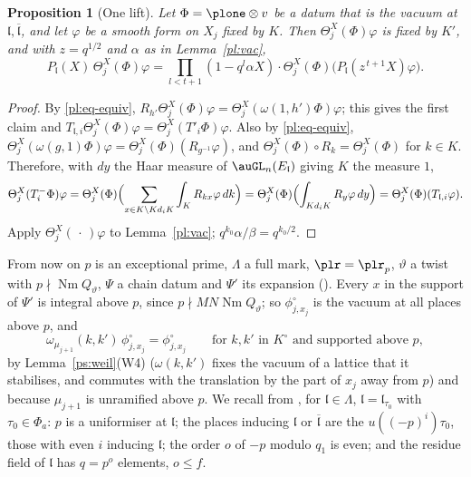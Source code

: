 \documentclass[10pt]{amsart}
\newtheorem{proposition}[theorem]{Proposition}
\theoremstyle{definition}
\theoremstyle{remark}
\providecommand{\auNm}{\operatorname{Nm}}
\providecommand{\auPa}{\Phi_a}
\providecommand{\aubar}[1]{\overline{#1}}
\begin{document}
\begin{proposition}[One lift]\label{pl:onelift}
Let $\Phi=\plone\otimes v$ be a datum that is the vacuum at $\mathfrak l,\aubar{\mathfrak l}$, and
let $\varphi$ be a smooth form on $X_j$ fixed by $K$. Then $\Theta^X_j(\Phi)\varphi$ is fixed by
$K'$, and with $z=q^{1/2}$ and $\alpha$ as in Lemma~\ref{pl:vac},
\[
P_{\mathfrak l}(X)\,\Theta^X_j(\Phi)\varphi=\prod_{l<t+1}(1-q^l\alpha X)\cdot\Theta^X_j(\Phi)\bigl(
P_{\mathfrak l}(z^{\,t+1}X)\varphi\bigr).
\]
\end{proposition}
\begin{proof}
By \eqref{pl:eq-equiv}, $R_{h'}\Theta^X_j(\Phi)\varphi=\Theta^X_j(\omega(1,h')\Phi)\varphi$; this
gives the first claim and $T_{\mathfrak l,i}\Theta^X_j(\Phi)\varphi=\Theta^X_j(T'_i\Phi)\varphi$.
Also by \eqref{pl:eq-equiv}, $\Theta^X_j(\omega(g,1)\Phi)\varphi=\Theta^X_j(\Phi)(R_{g^{-1}}
\varphi)$, and $\Theta^X_j(\Phi)\circ R_k=\Theta^X_j(\Phi)$ for $k\in K$. Therefore, with $dy$ the
Haar measure of $\auGL_n(E_{\mathfrak l})$ giving $K$ the measure $1$,
\[
\Theta^X_j(T^-_i\Phi)\varphi=\Theta^X_j(\Phi)\Bigl(\sum_{x\in K\backslash Kd_iK}\int_KR_{kx}\varphi
\,dk\Bigr)=\Theta^X_j(\Phi)\Bigl(\int_{Kd_iK}R_y\varphi\,dy\Bigr)=\Theta^X_j(\Phi)(T_{\mathfrak l,i}
\varphi).
\]
Apply $\Theta^X_j(\,\cdot\,)\varphi$ to Lemma~\ref{pl:vac}; $q^{k_0}\alpha/\beta=q^{k_0/2}$.
\end{proof}

From now on $p$ is an exceptional prime, $\Lambda$ a full mark, $\plr=\plr_p$, $\vartheta$ a twist
with $p\nmid\auNm Q_\vartheta$, $\Psi$ a chain datum and $\Psi'$ its expansion
({\cite[Proposition~14.25]{P46}}). Every $x$ in the support of $\Psi'$ is integral above $p$, since
$p\nmid MN\auNm Q_\vartheta$; so $\phi^\circ_{j,x_j}$ is the vacuum at all places above $p$, and
\begin{equation}\label{pl:eq-fix}
\omega_{\mu_{j+1}}(k,k')\,\phi^\circ_{j,x_j}=\phi^\circ_{j,x_j}\qquad\text{for }k,k'\text{ in }
K^\circ\text{ and supported above }p,
\end{equation}
by Lemma~\ref{ps:weil}(W4) ($\omega(k,k')$ fixes the vacuum of a lattice that it stabilises, and
commutes with the translation by the part of $x_j$ away from $p$) and because $\mu_{j+1}$ is
unramified above $p$. We recall from {\cite[\S2.7]{P50}}, for $\mathfrak l\in\Lambda$, $\mathfrak
l=\mathfrak l_{\tau_0}$ with $\tau_0\in\auPa$: $p$ is a uniformiser at $\mathfrak l$; the places
inducing $\mathfrak l$ or $\aubar{\mathfrak l}$ are the $u((-p)^i)\tau_0$, those with even $i$
inducing $\mathfrak l$; the order $o$ of $-p$ modulo $q_1$ is even; and the residue field of
$\mathfrak l$ has $q=p^{o}$ elements, $o\le f$.
\end{document}
